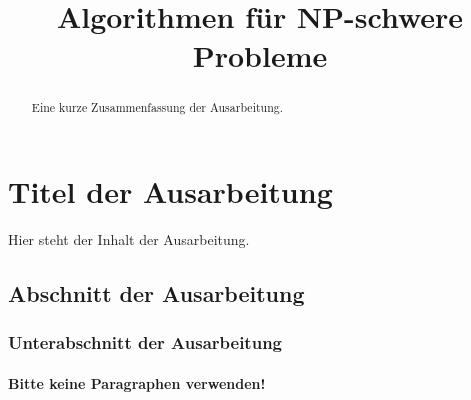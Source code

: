 \documentclass[a4paper,ngerman]{atseminar}
\title{Algorithmen für NP-schwere Probleme}
\author{}
\begin{document}
\maketitle

\GERMAN

\section{Titel der Ausarbeitung}

\begin{abstract}
Eine kurze Zusammenfassung der Ausarbeitung. 
\end{abstract}

Hier steht der Inhalt der Ausarbeitung.



\subsection{Abschnitt der Ausarbeitung}

\subsubsection{Unterabschnitt der Ausarbeitung}


\paragraph{Bitte keine Paragraphen verwenden!}
\end{document}
